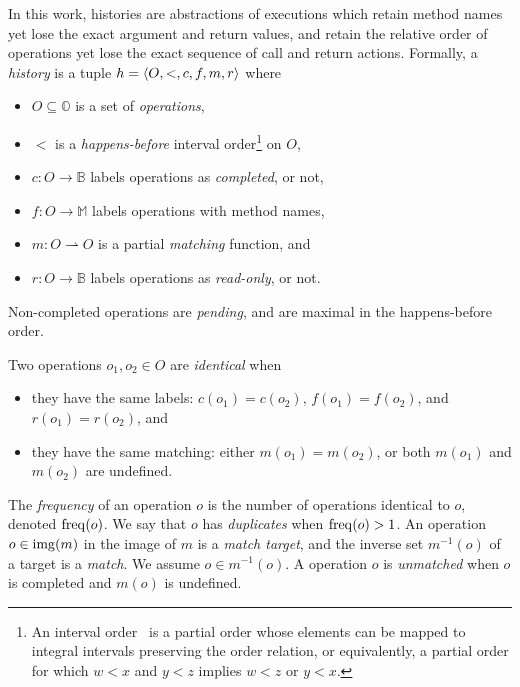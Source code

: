 In this work, histories are abstractions of executions which retain method
names yet lose the exact argument and return values, and retain the relative
order of operations yet lose the exact sequence of call and return actions.
Formally, a \emph{history} is a tuple $h = {\left\langle{O,<,c,f,m,r}\right\rangle}$ where
\begin{itemize}

  \item $O \subseteq \mathbb{O}$ is a set of \emph{operations},

  \item $<$ is a \emph{happens-before} interval order\footnote{An interval
  order~\cite{books/Fishburn85} is a partial order whose elements can be mapped
  to integral intervals preserving the order relation, or equivalently, a
  partial order for which $w < x$ and $y < z$ implies $w < z$ or $y < x$.} on
  $O$,

  \item $c: O \to \mathbb{B}$ labels operations as \emph{completed}, or not,

  \item $f: O \to \mathbb{M}$ labels operations with method names,

  \item $m: O \rightharpoonup O$ is a partial \emph{matching} function, and

  \item $r: O \to \mathbb{B}$ labels operations as \emph{read-only}, or not.

\end{itemize}
Non-completed operations are \emph{pending}, and are maximal in the
happens-before order. 

Two operations $o_1, o_2 \in O$ are \emph{identical} when
\begin{itemize}

  \item they have the same labels: $c(o_1) = c(o_2)$, $f(o_1)= f(o_2)$, and
  $r(o_1) = r(o_2)$, and

  \item they have the same matching: either $m(o_1) = m(o_2)$, or both $m(o_1)$
  and $m(o_2)$ are undefined.

\end{itemize} 
The \emph{frequency} of an operation $o$ is the number of operations identical
to $o$, denoted $\operatorname{freq}(o)$. We say that $o$ has \emph{duplicates} when
$\operatorname{freq}(o) > 1$. An operation $o \in \operatorname{img}(m)$ in the image of $m$ is a
\emph{match target}, and the inverse set $m^{-1}(o)$ of a target is a
\emph{match}. We assume $o \in m^{-1}(o)$. A operation $o$ is \emph{unmatched}
when $o$ is completed and $m(o)$ is undefined.

